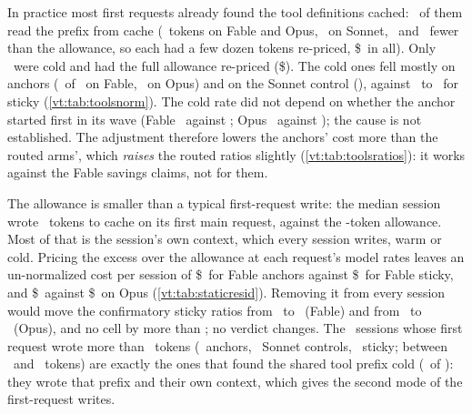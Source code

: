 In practice most first requests already found the tool definitions cached: \RvWarmTotal\ of them read the prefix
from cache (\RvWarmReadFable\ tokens on Fable and Opus, \RvWarmReadSonnet\ on Sonnet, \RvAllowGapFable\ and \RvAllowGapSonnet\ fewer than the
allowance, so each had a few dozen tokens re-priced, \$\RvWarmUSD\ in all). Only \RvColdTotal\ were cold and had the
full allowance re-priced (\$\RvColdUSD). The cold ones fell mostly on anchors (\RvColdFableAnchor\ of \NStickyPerHost\ on Fable,
\RvColdOpusAnchor\ on Opus) and on the Sonnet control (\RvColdSonnet), against \RvColdFableSticky\ to
\RvColdOpusSticky\ for sticky (\cref{vt:tab:toolsnorm}). The cold rate did not depend on whether the anchor started
first in its wave (Fable \RvColdFirstFable\ against \RvColdNotFirstFable; Opus \RvColdFirstOpus\ against
\RvColdNotFirstOpus); the cause is not established. The adjustment therefore lowers the anchors' cost more than the routed arms', which \emph{raises} the routed
ratios slightly (\cref{vt:tab:toolsratios}): it works against the Fable savings claims, not for them.

The allowance is smaller than a typical first-request write: the median session wrote \RgStaticMedian\ tokens to
cache on its first main request, against the \ToolsAllowance-token allowance. Most of that is the session's own
context, which every session writes, warm or cold. Pricing the excess over the allowance at each request's model
rates leaves an un-normalized cost per session of \$\RgResidFableAnchor\ for Fable anchors against
\$\RgResidFableSticky\ for Fable sticky, and \$\RgResidOpusAnchor\ against \$\RgResidOpusSticky\ on Opus
(\cref{vt:tab:staticresid}). Removing it from every session would move the confirmatory sticky ratios from
\CfFableStickyPair\ to \RgResidAdjFableSticky\ (Fable) and from \CfOpusStickyPair\ to \RgResidAdjOpusSticky\ (Opus),
and no cell by more than \RgResidShiftMax; no verdict changes. The \RgBigN\ sessions whose first request wrote more
than \RgBigThreshold\ tokens (\RgBigAnchors\ anchors, \RgBigSonnet\ Sonnet controls, \RgBigSticky\ sticky; between
\RgBigLow\ and \RgBigHigh\ tokens) are exactly the ones that found the shared tool prefix cold (\RgBigInCold\ of
\RgBigN): they wrote that prefix and their own context, which gives the second mode of the first-request writes.

\begin{table}[tbp]
\centering\small
\caption{Un-normalized static-write cost per session: the first main request's cache write beyond the
\ToolsAllowance-token allowance, priced at the write-minus-read rate of that request's model.}
\label{vt:tab:staticresid}

\end{table}

